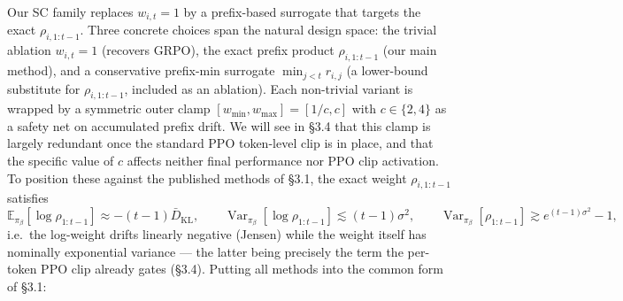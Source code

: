 \documentclass[11pt,a4paper]{article}
\theoremstyle{remark}
\begin{document}
Our SC family replaces $w_{i,t}=1$ by a prefix-based surrogate that targets the exact $\rho_{i,1:t-1}$. Three concrete choices span the natural design space: the trivial ablation $w_{i,t}=1$ (recovers GRPO), the exact prefix product $\rho_{i,1:t-1}$ (our main method), and a conservative prefix-min surrogate $\min_{j<t}r_{i,j}$ (a lower-bound substitute for $\rho_{i,1:t-1}$, included as an ablation). Each non-trivial variant is wrapped by a symmetric outer clamp $[w_{\min},w_{\max}]=[1/c, c]$ with $c\!\in\!\{2,4\}$ as a safety net on accumulated prefix drift. We will see in §3.4 that this clamp is largely redundant once the standard PPO token-level clip is in place, and that the specific value of $c$ affects neither final performance nor PPO clip activation. To position these against the published methods of §3.1, the exact weight $\rho_{i,1:t-1}$ satisfies
\[
\mathbb E_{\pi_\beta}[\log\rho_{1:t-1}] \approx -(t-1)\bar D_{\mathrm{KL}},\qquad
\operatorname{Var}_{\pi_\beta}[\log\rho_{1:t-1}] \lesssim (t-1)\sigma^2,\qquad
\operatorname{Var}_{\pi_\beta}[\rho_{1:t-1}] \gtrsim e^{(t-1)\sigma^2}-1,
\]
i.e.\ the log-weight drifts linearly negative (Jensen) while the weight itself has nominally exponential variance --- the latter being precisely the term the per-token PPO clip already gates (§3.4). Putting all methods into the common form of §3.1:

\begin{table}[H]\centering
\footnotesize
\setlength{\tabcolsep}{4pt}
\end{table}
\end{document}
